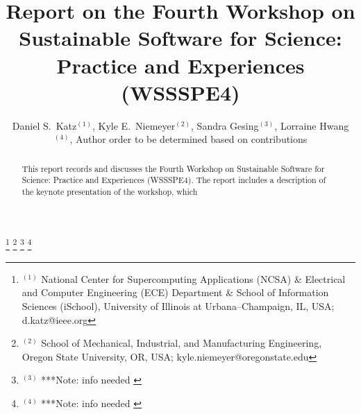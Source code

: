\documentclass[11pt, oneside]{amsart}
\newcommand{\note}[1]{ {\textcolor{blueish}    { ***Note:      #1 }}}
\begin{document}
\title[]{Report on the Fourth Workshop on Sustainable Software for Science: Practice and Experiences (WSSSPE4)}

\author{Daniel S.\ Katz$^{(1)}$,
Kyle E.\ Niemeyer$^{(2)}$,
Sandra Gesing$^{(3)}$,
Lorraine Hwang$^{(4)}$,
Author order to be determined based on contributions
}

%
\thanks{{}$^{(1)}$ \hspace{-1ex}National Center for Supercomputing Applications (NCSA) \&
Electrical and Computer Engineering (ECE) Department \&
School of Information Sciences (iSchool),
University of Illinois at Urbana--Champaign, IL, USA; d.katz@ieee.org}
%
\thanks{{}$^{(2)}$ School of Mechanical, Industrial, and Manufacturing Engineering,
Oregon State University, OR, USA; kyle.niemeyer@oregonstate.edu}
%
\thanks{{}$^{(3)}$ \note{info needed}}
%
\thanks{{}$^{(4)}$ \note{info needed}}


\begin{abstract}
This report records and discusses the Fourth Workshop on Sustainable
Software for Science: Practice and Experiences (WSSSPE4). The report
includes a description of the keynote presentation of the workshop,
which %

\end{abstract}



\maketitle
\newpage
\end{document}
